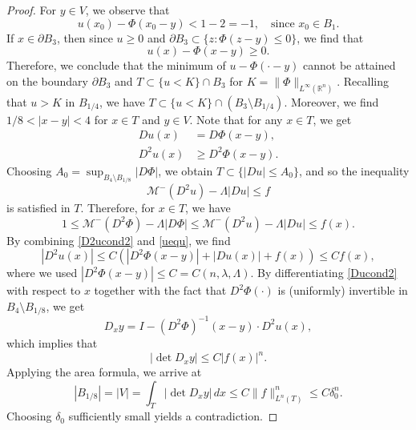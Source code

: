 \documentclass[10pt,a4paper]{amsart}
\begin{document}
\begin{proof}
For $y \in V$, we observe that
\begin{equation*}
    u(x_0)-\Phi(x_0-y) < 1-2=-1, \quad \text{since $x_0 \in B_1$}.
\end{equation*}
If $x\in \partial B_3$, then since $u \geq 0$  and $\partial B_{3} \subset \{z:\Phi(z-y) \leq 0\}$, we find that
\begin{equation*}
    u(x) - \Phi(x-y) \geq 0.
\end{equation*}
Therefore, we conclude that the minimum of $u-\Phi(\cdot-y)$ cannot be attained on the boundary $\partial B_3$ and $T \subset \{ u<K\} \cap B_3$ for $K=\|\Phi\|_{L^\infty(\mathbb{R}^n)}$.
Recalling that $u>K$ in $B_{1/4}$, we have $T \subset \{ u<K\} \cap (B_3 \setminus B_{1/4})$.
Moreover, we find $1/8<|x-y| < 4$ for $x \in T$ and $y \in V$.
Note that for any $x \in T$, we get
\begin{align} \label{Ducond2}
    Du(x) &= D\Phi(x-y),\\ \label{D2ucond2}
    D^2u(x) &\geq D^2\Phi(x-y).
\end{align}
Choosing $A_0=\sup_{B_4\setminus B_{1/8}}|D\Phi|$, we obtain $T \subset \{|Du| \leq A_0\}$, and so the inequality
\begin{equation*}
    \mathcal{M}^-(D^2u)-\Lambda|Du| \leq f
\end{equation*}
is satisfied in $T$. Therefore, for $x \in T$, we have
\begin{equation} \label{uequ}
    1 \leq \mathcal{M}^-(D^2\Phi) -\Lambda|D\Phi| \leq \mathcal{M}^-(D^2u) -\Lambda|Du| \leq f(x).
\end{equation}
By combining \eqref{D2ucond2} and \eqref{uequ}, we find
\begin{equation*}
    |D^2u(x)| \leq C(|D^2\Phi(x-y)| + |Du(x)| +f(x)) \leq Cf(x),
\end{equation*}
where we used $|D^2\Phi(x-y)| \leq C=C(n, \lambda, \Lambda)$.
By differentiating \eqref{Ducond2} with respect to $x$ together with the fact that $D^2\Phi(\cdot)$ is (uniformly) invertible in $B_4 \setminus B_{1/8}$, we get
\begin{equation*}
	D_xy= I- (D^2 \Phi)^{-1}(x-y)  \cdot D^2u(x),
\end{equation*}
which implies that
\begin{equation*}
   |\det D_xy| \leq C|f(x)|^n.
\end{equation*}
Applying the area formula, we arrive at
\begin{equation*}
    |B_{1/8}| = |V| =\int_{T}|\det D_xy|\,dx \leq C\|f\|_{L^n(T)}^n \leq C\delta_0^n.
\end{equation*}
Choosing $\delta_0$ sufficiently small yields a contradiction.
\end{proof}
\end{document}
